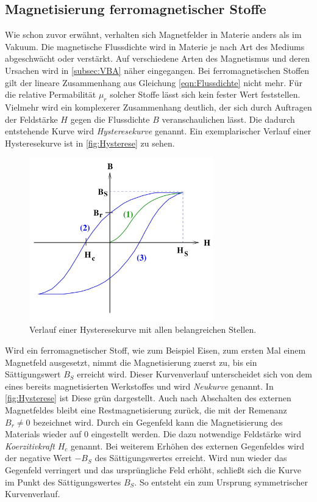 \subsection{Magnetisierung ferromagnetischer Stoffe}
\label{subsec:Hysterese}
Wie schon zuvor erwähnt, verhalten sich Magnetfelder in Materie anders als im Vakuum. Die magnetische Flussdichte wird in Materie je nach Art des Mediums
abgeschwächt oder verstärkt. Auf verschiedene Arten des Magnetismus und deren Ursachen wird in \autoref{subsec:VBA} näher eingegangen. Bei ferromagnetischen Stoffen gilt der lineare 
Zusammenhang aus Gleichung \eqref{eqn:Flussdichte} nicht mehr. Für die relative Permabilität $\mu_r$ solcher Stoffe lässt sich kein fester Wert feststellen. Vielmehr wird ein 
komplexerer Zusammenhang deutlich, der sich durch Auftragen der Feldstärke $H$ gegen die Flussdichte $B$ veranschaulichen lässt. Die dadurch entstehende Kurve wird 
\textit{Hysteresekurve} genannt. Ein exemplarischer Verlauf einer Hysteresekurve ist in \autoref{fig:Hysterese} zu sehen.

\begin{figure}
    \centering
    \caption{Verlauf einer Hysteresekurve mit allen belangreichen Stellen. \cite{v308}}
    \label{fig:Hysterese}
    \includegraphics[width=8cm]{content/Hysteresekurve.jpg}
\end{figure}

Wird ein ferromagnetischer Stoff, wie zum Beispiel Eisen, zum ersten Mal einem Magnetfeld ausgesetzt, nimmt die Magnetisierung zuerst zu, bis ein Sättigungswert $B_S$ erreicht wird.
Dieser Kurvenverlauf unterscheidet sich von dem eines bereits magnetisierten Werkstoffes und wird \textit{Neukurve} genannt. In \autoref{fig:Hysterese} ist Diese grün dargestellt. 
Auch nach Abschalten des externen Magnetfeldes bleibt eine Restmagnetisierung zurück, die mit der Remenanz $B_r \neq 0$ bezeichnet wird. Durch ein Gegenfeld kann die
Magnetisierung des Materials wieder auf 0 eingestellt werden. Die dazu notwendige Feldstärke wird \textit{Koerzitivkraft} $H_c$ genannt. Bei weiterem Erhöhen des externen 
Gegenfeldes wird der negative Wert $-B_S$ des Sättigungswertes erreicht. Wird nun wieder das Gegenfeld verringert und das ursprüngliche Feld erhöht, schließt sich die Kurve 
im Punkt des Sättigungswertes $B_S$. So entsteht ein zum Ursprung symmetrischer Kurvenverlauf.
